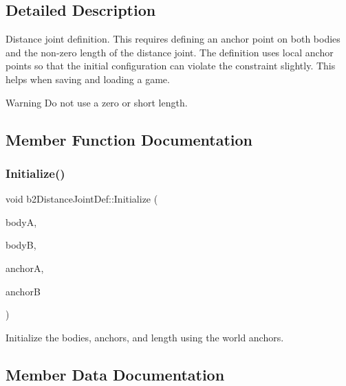 \subsection{Detailed Description}
Distance joint definition. This requires defining an anchor point on both bodies and the non-\/zero length of the distance joint. The definition uses local anchor points so that the initial configuration can violate the constraint slightly. This helps when saving and loading a game. \begin{DoxyWarning}{Warning}
Do not use a zero or short length. 
\end{DoxyWarning}


\subsection{Member Function Documentation}
\mbox{\label{structb2DistanceJointDef_a99788a534638cc28cd1e44e0036503f0}} 
\subsubsection{\texorpdfstring{Initialize()}{Initialize()}}
{\footnotesize\ttfamily void b2\+Distance\+Joint\+Def\+::\+Initialize (\begin{DoxyParamCaption}\item[{\mbox{\hyperlink{classb2Body}{b2\+Body}} $\ast$}]{bodyA,  }\item[{\mbox{\hyperlink{classb2Body}{b2\+Body}} $\ast$}]{bodyB,  }\item[{const \mbox{\hyperlink{structb2Vec2}{b2\+Vec2}} \&}]{anchorA,  }\item[{const \mbox{\hyperlink{structb2Vec2}{b2\+Vec2}} \&}]{anchorB }\end{DoxyParamCaption})}

Initialize the bodies, anchors, and length using the world anchors. 

\subsection{Member Data Documentation}
\mbox{\label{structb2DistanceJointDef_a35e2362bcb6c58734f95d0ac045863ea}} 
